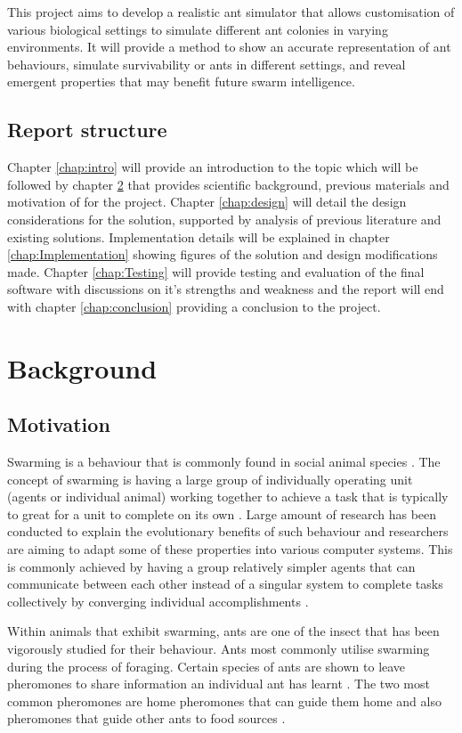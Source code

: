 \documentclass[a4paper, oneside, 11pt]{report}
\begin{document}
This project aims to develop a realistic ant simulator that allows customisation of various biological settings to simulate different ant colonies in varying environments. It will provide a method to show an accurate representation of ant behaviours, simulate survivability or ants in different settings, and reveal emergent properties that may benefit future swarm intelligence.

\section{Report structure}
Chapter \ref{chap:intro} will provide an introduction to the topic which will be followed by chapter \ref{chap:background} that provides scientific background, previous materials and motivation of for the project. Chapter \ref{chap:design} will detail the design considerations for the solution, supported by analysis of previous literature and existing solutions. Implementation details will be explained in chapter \ref{chap:Implementation} showing figures of the solution and design modifications made. Chapter \ref{chap:Testing} will provide testing and evaluation of the final software with discussions on it's strengths and weakness and the report will end with chapter \ref{chap:conclusion} providing a conclusion to the project.

\chapter{Background}
\label{chap:background}
\section{Motivation}
Swarming is a behaviour that is commonly found in social animal species \citep{Swarm_Animals}. The concept of swarming is having a large group of individually operating unit (agents or individual animal) working together to achieve a task that is typically to great for a unit to complete on its own \citep{Swarm_Explanation}. Large amount of research has been conducted to explain the evolutionary benefits of such behaviour and researchers are aiming to adapt some of these properties into various computer systems. This is commonly achieved by having a group relatively simpler agents that can communicate between each other instead of a singular system to complete tasks collectively by converging individual accomplishments \citep{Swarm_Properties}.

Within animals that exhibit swarming, ants are one of the insect that has been vigorously studied for their behaviour. Ants most commonly utilise swarming during the process of foraging. Certain species of ants are shown to leave pheromones to share information an individual ant has learnt \citep{Ant_Pheromones}. The two most common pheromones are home pheromones that can guide them home and also pheromones that guide other ants to food sources \citep{Ant_Pheromones}. 
\end{document}
